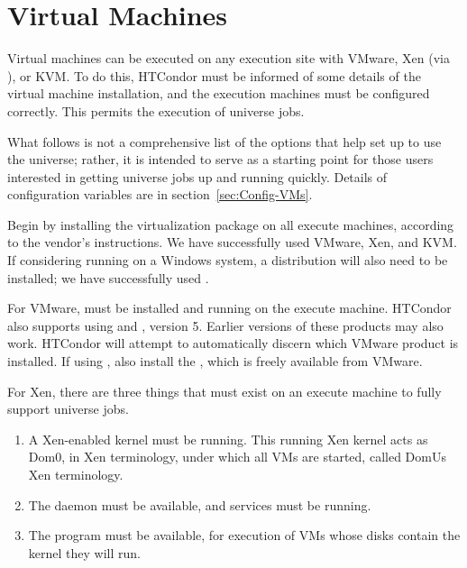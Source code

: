 \section{\label{sec:vm-install}Virtual Machines}


Virtual machines can be executed on any execution site with VMware, Xen
(via ), or KVM.
To do this, HTCondor must be informed of some details of the 
virtual machine installation, and the execution machines must
be configured correctly.
This permits the execution of  universe jobs.

What follows is not a comprehensive list of the options that
help set up to use the  universe; rather,
it is intended to serve as a starting point for those users interested in
getting  universe jobs up and running quickly.
Details of configuration variables are in section~\ref{sec:Config-VMs}.

Begin by installing the virtualization package on all execute machines,
according to the vendor's instructions.
We have successfully used VMware, Xen, and KVM.
If considering running on a Windows system, 
a  distribution will also need to be installed;
we have successfully used . 

For VMware,  must be installed
and running on the execute machine.
HTCondor also
supports using  and , version 5.
Earlier versions of these products may also work.  
HTCondor will attempt to automatically discern which 
VMware product is installed.
If using , also install the ,
which is freely available from VMware.

For Xen, there are three things that must exist on 
an execute machine to fully support  universe jobs. 
\begin{enumerate}
\item
A Xen-enabled kernel must be running. 
This running Xen kernel acts as Dom0, in Xen terminology, 
under which all VMs are started, called DomUs Xen terminology. 

\item
The  daemon must be available,
and  services must be running. 

\item
The  program must be available,
for execution of VMs whose disks contain the kernel they will run.
\end{enumerate}

